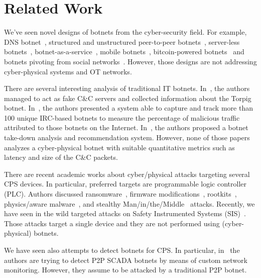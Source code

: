 \documentclass[sigconf]{acmart}
\makeatletter
\newcommand{\CC}{C\&C\@\xspace}
\makeatother
\begin{document}


\section{Related Work}
\label{sec:related}

We've seen novel designs of botnets from the cyber-security field. For
example, DNS botnet~\cite{anagnostopoulos2013dns}, structured and unstructured
peer-to-peer botnets~\cite{wang2010advanced,rossow2013sok}, server-less
botnets~\cite{zhao2017serverless}, botnet-as-a-service~\cite{chang2014baas},
mobile botnets~\cite{mtibaa2015mobibot}, bitcoin-powered
botnets~\cite{ali2015zombie} and botnets pivoting from social
networks~\cite{compagno2015elisa}. However, those designs are not addressing
cyber-physical systems and OT networks.

There are several interesting analysis of traditional IT botnets.
In~\cite{stone2011analysis}, the authors managed to act as fake \CC servers and
collected information about the Torpig botnet. In~\cite{abu2006multifaceted},
the authors presented a system able to capture and track more than 100 unique
IRC-based botnets to measure the percentage of malicious traffic attributed
to those botnets on the Internet. In~\cite{nadji2013beheading}, the authors
proposed a botnet take-down analysis and recommendation system. However, none of
those papers analyzes a cyber-physical botnet with suitable quantitative
metrics such as latency and size of the \CC packets.

There are recent academic works about cyber\-/physical attacks targeting several CPS
devices. In particular, preferred targets are programmable logic controller
(PLC). Authors discussed ran\-som\-wa\-re~\cite{formby17ransomics}, firmware
modifications~\cite{cui2013firmware}, rootkits~\cite{abbasi2016ghost},
physics\-/aware malware~\cite{garcia2017hey}, and stealthy
Man\-/in\-/the\-/Middle~\cite{urbina2016attacking} attacks. Recently, we
have seen in the wild targeted attacks on Safety Instrumented Systems
(SIS)~\cite{dragos2017trisis}.
Those attacks target a single device and they are not performed using
(cyber-physical) botnets.

We have seen also attempts to detect botnets for CPS. In particular,
in~\cite{yang2017scada} the authors are trying to detect P2P SCADA botnets by
means of custom network monitoring. However, they assume to be attacked by a
traditional P2P botnet.
\end{document}

